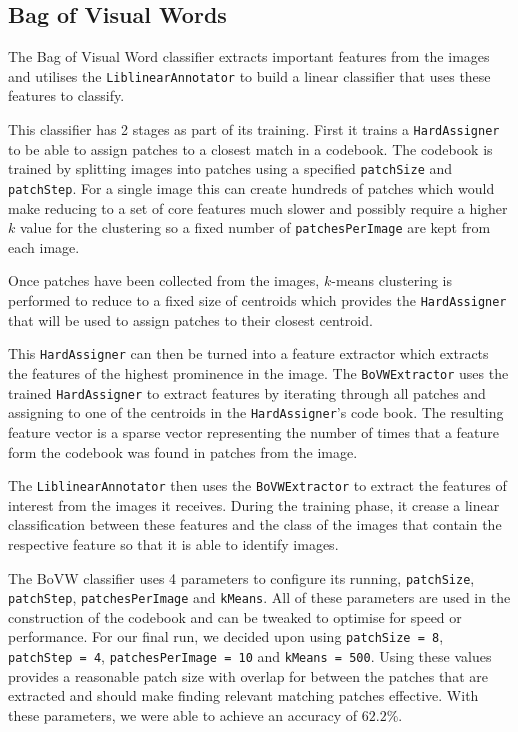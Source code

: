 \documentclass[paper=a4, fontsize=11pt]{article}
\begin{document}
\subsection{Bag of Visual Words}

The Bag of Visual Word classifier extracts important features from the images and utilises the \texttt{LiblinearAnnotator} to build a linear classifier that uses these features to classify.

This classifier has 2 stages as part of its training. First it trains a \texttt{HardAssigner} to be able to assign patches to a closest match in a codebook. The codebook is trained by splitting images into patches using a specified  \texttt{patchSize} and \texttt{patchStep}. For a single image this can create hundreds of patches which would make reducing to a set of core features much slower and possibly require a higher $k$ value for the clustering so a fixed number of \texttt{patchesPerImage} are kept from each image. 

Once patches have been collected from the images, $k$-means clustering is performed to reduce to a fixed size of centroids which provides the \texttt{HardAssigner} that will be used to assign patches to their closest centroid.

This \texttt{HardAssigner} can then be turned into a feature extractor which extracts the features of the highest prominence in the image. The \texttt{BoVWExtractor} uses the trained \texttt{HardAssigner} to extract features by iterating through all patches and assigning to one of the centroids in the \texttt{HardAssigner}'s code book. The resulting feature vector is a sparse vector representing the number of times that a feature form the codebook was found in patches from the image.

The \texttt{LiblinearAnnotator} then uses the \texttt{BoVWExtractor} to extract the features of interest from the images it receives. During the training phase, it crease a linear classification between these features and the class of the images that contain the respective feature so that it is able to identify images.

The BoVW classifier uses 4 parameters to configure its running, \texttt{patchSize}, \texttt{patchStep}, \texttt{patchesPerImage} and \texttt{kMeans}. All of these parameters are used in the construction of the codebook and can be tweaked to optimise for speed or performance. For our final run, we decided upon using \texttt{patchSize = 8}, \texttt{patchStep = 4}, \texttt{patchesPerImage = 10} and \texttt{kMeans = 500}. Using these values provides a reasonable patch size with overlap for between the patches that are extracted and should make finding relevant matching patches effective. With these parameters, we were able to achieve an accuracy of $62.2\%$.
\end{document}

